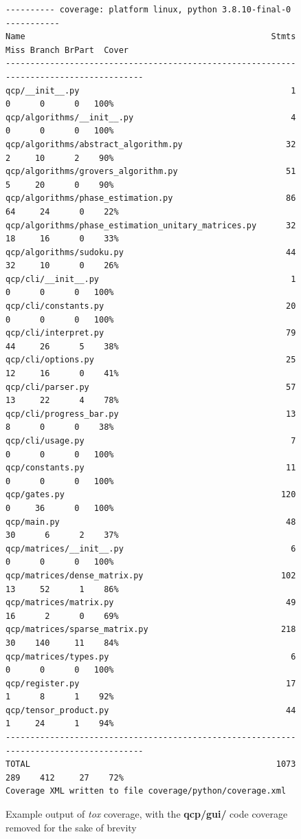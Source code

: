 \documentclass{article}
\begin{document}
\begin{figure}
\begin{verbatim}
---------- coverage: platform linux, python 3.8.10-final-0 -----------
Name                                                  Stmts   Miss Branch BrPart  Cover
---------------------------------------------------------------------------------------
qcp/__init__.py                                           1      0      0      0   100%
qcp/algorithms/__init__.py                                4      0      0      0   100%
qcp/algorithms/abstract_algorithm.py                     32      2     10      2    90%
qcp/algorithms/grovers_algorithm.py                      51      5     20      0    90%
qcp/algorithms/phase_estimation.py                       86     64     24      0    22%
qcp/algorithms/phase_estimation_unitary_matrices.py      32     18     16      0    33%
qcp/algorithms/sudoku.py                                 44     32     10      0    26%
qcp/cli/__init__.py                                       1      0      0      0   100%
qcp/cli/constants.py                                     20      0      0      0   100%
qcp/cli/interpret.py                                     79     44     26      5    38%
qcp/cli/options.py                                       25     12     16      0    41%
qcp/cli/parser.py                                        57     13     22      4    78%
qcp/cli/progress_bar.py                                  13      8      0      0    38%
qcp/cli/usage.py                                          7      0      0      0   100%
qcp/constants.py                                         11      0      0      0   100%
qcp/gates.py                                            120      0     36      0   100%
qcp/main.py                                              48     30      6      2    37%
qcp/matrices/__init__.py                                  6      0      0      0   100%
qcp/matrices/dense_matrix.py                            102     13     52      1    86%
qcp/matrices/matrix.py                                   49     16      2      0    69%
qcp/matrices/sparse_matrix.py                           218     30    140     11    84%
qcp/matrices/types.py                                     6      0      0      0   100%
qcp/register.py                                          17      1      8      1    92%
qcp/tensor_product.py                                    44      1     24      1    94%
---------------------------------------------------------------------------------------
TOTAL                                                  1073    289    412     27    72%
Coverage XML written to file coverage/python/coverage.xml

\end{verbatim}
\caption{\label{tox-coverage} Example output of \textit{tox} coverage, with the \textbf{qcp/gui/} code coverage removed for the sake of brevity}
\end{figure}
\end{document}
